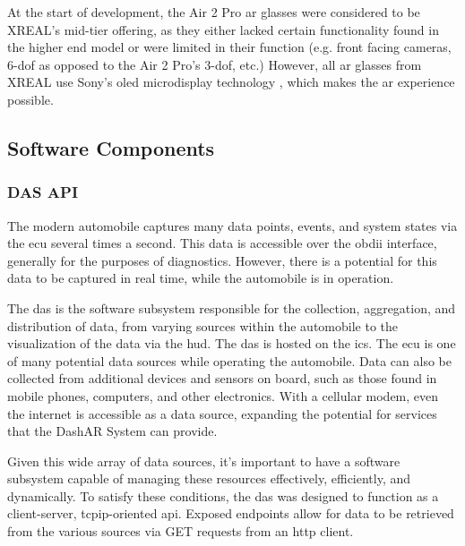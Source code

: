             \par At the start of development, the Air 2 Pro \gls{ar} glasses were considered to be XREAL's mid-tier offering, as they either lacked certain functionality found in the higher end model or were limited in their function (e.g. front facing cameras, 6-\gls{dof} as opposed to the Air 2 Pro's 3-\gls{dof}, etc.) However, all \gls{ar} glasses from XREAL use Sony's \gls{oled} microdisplay technology \cite{SSSC2025}, which makes the \gls{ar} experience possible.

    \subsection{Software Components}
            \subsubsection{DAS API}
                \par The modern automobile captures many data points, events, and system states via the \gls{ecu} several times a second. This data is accessible over the \gls{obdii} interface, generally for the purposes of diagnostics. However, there is a potential for this data to be captured in real time, while the automobile is in operation.

                \par The \gls{das} is the software subsystem responsible for the collection, aggregation, and distribution of data, from varying sources within the automobile to the visualization of the data via the \gls{hud}. The \gls{das} is hosted on the \gls{ics}. The \gls{ecu} is one of many potential data sources while operating the automobile. Data can also be collected from additional devices and sensors on board, such as those found in mobile phones, computers, and other electronics. With a cellular modem, even the internet is accessible as a data source, expanding the potential for services that the DashAR System can provide.

                \par Given this wide array of data sources, it's important to have a software subsystem capable of managing these resources effectively, efficiently, and dynamically. To satisfy these conditions, the \gls{das} was designed to function as a client-server, \gls{tcpip}-oriented \gls{api}. Exposed endpoints allow for data to be retrieved from the various sources via GET requests from an \gls{http} client.

